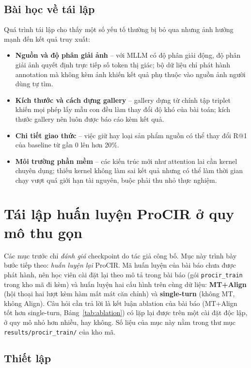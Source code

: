 \subsection{Bài học về tái lập}

Quá trình tái lập cho thấy một số yếu tố thường bị bỏ qua nhưng ảnh hưởng mạnh đến kết quả truy xuất:
\begin{itemize}
    \item \textbf{Nguồn và độ phân giải ảnh} -- với MLLM có độ phân giải động, độ phân giải ảnh quyết định trực tiếp số token thị giác; bộ dữ liệu chỉ phát hành annotation mà không kèm ảnh khiến kết quả phụ thuộc vào nguồn ảnh người dùng tự tìm.
    \item \textbf{Kích thước và cách dựng gallery} -- gallery dựng từ chính tập triplet khiến mọi phép lấy mẫu con đều làm thay đổi độ khó của bài toán; kích thước gallery nên luôn được báo cáo kèm kết quả.
    \item \textbf{Chi tiết giao thức} -- việc giữ hay loại sản phẩm nguồn có thể thay đổi R@1 của baseline từ gần 0 lên hơn 20\%.
    \item \textbf{Môi trường phần mềm} -- các kiến trúc mới như attention lai cần kernel chuyên dụng; thiếu kernel không làm sai kết quả nhưng có thể làm thời gian chạy vượt quá giới hạn tài nguyên, buộc phải thu nhỏ thực nghiệm.
\end{itemize}

\section{Tái lập huấn luyện ProCIR ở quy mô thu gọn}\label{sec:train-repro}

Các mục trước chỉ \emph{đánh giá} checkpoint do tác giả công bố. Mục này trình bày bước tiếp theo: \emph{huấn luyện lại} ProCIR. Mã huấn luyện của bài báo chưa được phát hành, nên học viên cài đặt lại theo mô tả trong bài báo (gói \texttt{procir\_train} trong kho mã đi kèm) và huấn luyện hai cấu hình trên cùng dữ liệu: \textbf{MT+Align} (hội thoại hai lượt kèm hàm mất mát căn chỉnh) và \textbf{single-turn} (không MT, không Align). Câu hỏi cần trả lời là kết luận ablation của bài báo (MT+Align tốt hơn single-turn, Bảng~\ref{tab:ablation}) có lặp lại được trên một cài đặt độc lập, ở quy mô nhỏ hơn nhiều, hay không. Số liệu của mục này nằm trong thư mục \texttt{results/procir\_train/} của kho mã.

\subsection{Thiết lập}

